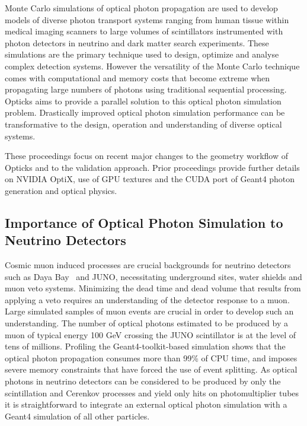 \documentclass{webofc}
\begin{document}
Monte Carlo simulations of optical photon propagation 
are used to develop models of diverse photon transport systems 
ranging from human tissue within medical imaging scanners 
to large volumes of scintillators instrumented with photon detectors in neutrino 
and dark matter search experiments. 
These simulations are the primary technique used to design, optimize 
and analyse complex detection systems. However the versatility 
of the Monte Carlo technique comes with computational and memory costs 
that become extreme when propagating large numbers of photons
using traditional sequential processing. Opticks aims to provide a 
parallel solution to this optical photon simulation problem.  Drastically 
improved optical photon simulation performance can be transformative 
to the design, operation and understanding of diverse optical systems.

These proceedings focus on recent major changes to the geometry workflow of Opticks 
and to the validation approach. Prior proceedings\cite{chep2016} provide further
details on NVIDIA OptiX, use of GPU textures and the CUDA port of Geant4 photon generation 
and optical physics.
%
\subsection{Importance of Optical Photon Simulation to Neutrino Detectors}
%
Cosmic muon induced processes are crucial backgrounds for neutrino
detectors such as Daya Bay~\cite{dyb} and JUNO\cite{juno},
necessitating underground sites, water shields and muon veto systems.
Minimizing the dead time and dead volume that results from applying
a veto requires an understanding of the detector response to a muon.
Large simulated samples of muon events are crucial in order to
develop such an understanding.
%
The number of optical photons estimated to be produced by a muon of
typical energy 100 GeV crossing the JUNO scintillator is at the level of tens of millions.
Profiling the Geant4-toolkit-based simulation shows that the optical photon propagation 
consumes more than 99\% of CPU time, and imposes severe memory constraints that have forced
the use of event splitting.  
%
As optical photons in neutrino detectors can be considered to be produced
by only the scintillation and Cerenkov processes and yield only hits
on photomultiplier tubes it is straightforward to integrate an
external optical photon simulation with a Geant4 simulation of all other particles.
%
\end{document}
